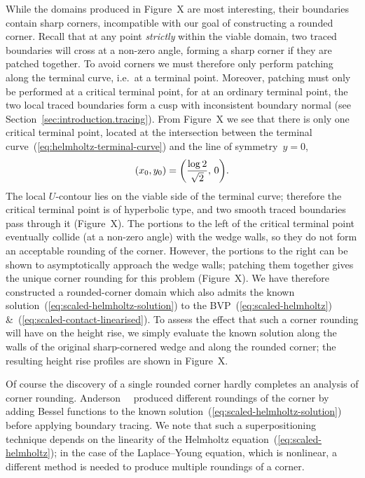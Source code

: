 While the domains produced in Figure~X
are most interesting,
their boundaries contain sharp corners,
incompatible with our goal of constructing a rounded corner.
Recall that at any point \emph{strictly} within the viable domain,
two traced boundaries will cross at a non-zero angle,
forming a sharp corner if they are patched together.
To avoid corners we must therefore only perform patching
along the terminal curve, i.e.~at a terminal point.
Moreover, patching must only be performed at a critical terminal point,
for at an ordinary terminal point,
the two local traced boundaries form a cusp with inconsistent boundary normal
(see Section~\ref{sec:introduction.tracing}).
From Figure~X
we see that there is only one critical terminal point,
located at the intersection between
the terminal curve~(\ref{eq:helmholtz-terminal-curve})
and the line of symmetry~$y = 0$,
\begin{equation}
  (x_0, y_0) = \roundbr*{\frac{\log 2}{\sqrt{2}}, \, 0}.
  \label{eq:helmholtz-critical-terminal-point}
\end{equation}
The local $U$-contour lies on the viable side of the terminal curve;
therefore the critical terminal point is of hyperbolic type,
and two smooth traced boundaries pass through it
(Figure~X). %
The portions to the left of the critical terminal point
eventually collide (at a non-zero angle) with the wedge walls,
so they do not form an acceptable rounding of the corner.
However, the portions to the right
can be shown to asymptotically approach the wedge walls;
patching them together gives the unique corner rounding
for this problem (Figure~X). %
We have therefore constructed a rounded-corner domain
which also admits the known solution~(\ref{eq:scaled-helmholtz-solution})
to the BVP~(\ref{eq:scaled-helmholtz})
\&~(\ref{eq:scaled-contact-linearised}).
To assess the effect that such a corner rounding will have
on the height rise,
we simply evaluate the known solution
along the walls of the original sharp-cornered wedge
and along the rounded corner;
the resulting height rise profiles are shown in
Figure~X. %

Of course the discovery of a single rounded corner
hardly completes an analysis of corner rounding.
Anderson~\etal~\cite{anderson-2007-boundary-tracing-ii-applications}
produced different roundings of the corner
by adding Bessel functions
to the known solution~(\ref{eq:scaled-helmholtz-solution})
before applying boundary tracing.
We note that such a superpositioning technique depends on
the linearity of the Helmholtz equation~(\ref{eq:scaled-helmholtz});
in the case of the Laplace--Young equation, which is nonlinear,
a different method is needed to produce multiple roundings of a corner.

